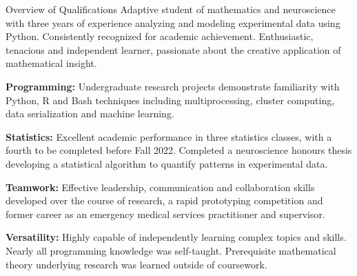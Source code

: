 \documentclass[12pt]{resume}
\begin{document}
\begin{rSection}{\Large Overview of Qualifications}
    Adaptive student of mathematics and neuroscience with three years of experience analyzing and modeling 
    experimental data using Python. Consistently recognized for academic achievement. Enthusiastic, 
    tenacious and independent learner, passionate about the creative application of mathematical
    insight. 

    {\bf Programming:} Undergraduate research projects demonstrate familiarity with Python, R and Bash
    techniques including multiprocessing, cluster computing, data serialization and machine
    learning. 

    {\bf Statistics:} Excellent academic performance in three statistics classes, with a fourth to be
    completed before Fall 2022. Completed a neuroscience honours thesis developing a statistical algorithm
    to quantify patterns in experimental data.

    {\bf Teamwork:} Effective leadership, communication and collaboration skills developed over the
    course of research, a rapid prototyping competition and former career as an emergency medical services
    practitioner and supervisor. 

    {\bf Versatility:} Highly capable of independently learning complex topics and skills. Nearly all 
    programming knowledge was self-taught. Prerequisite mathematical theory underlying research was
    learned outside of coursework.
\end{rSection}
\vspace{12pt}
\end{document}
